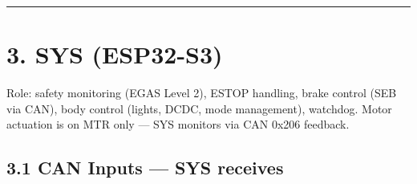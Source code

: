 \documentclass[12pt,a4paper,oneside]{report}
\begin{document}
\begin{center}\rule{0.5\linewidth}{0.5pt}\end{center}

\section{3. SYS (ESP32-S3)}\label{sys-esp32-s3}

Role: safety monitoring (EGAS Level 2), ESTOP handling, brake control (SEB via
CAN), body control (lights, DCDC, mode management), watchdog. Motor actuation is
on MTR only --- SYS monitors via CAN 0x206 feedback.

\subsection{3.1 CAN Inputs --- SYS receives}\label{can-inputs-sys-receives}
\end{document}
